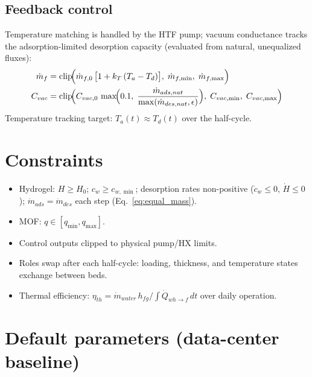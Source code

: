 \documentclass[11pt]{article}
\begin{document}
\subsection{Feedback control}

Temperature matching is handled by the HTF pump; vacuum conductance tracks the adsorption-limited desorption capacity (evaluated from natural, unequalized fluxes):
\begin{align}
\dot{m}_f &= \mathrm{clip}\!\Bigl(\dot{m}_{f,0}\,\bigl[1 + k_T\,(T_a - T_d)\bigr],\; \dot{m}_{f,\min},\; \dot{m}_{f,\max}\Bigr)
\label{eq:ctrl_mf}
\\
C_{vac} &= \mathrm{clip}\!\Bigl(
C_{vac,0}\,\max\!\Bigl(0.1,\; \frac{\dot{m}_{ads,nat}}{\max(\dot{m}_{des,nat}, \epsilon)}\Bigr),\;
C_{vac,\min},\; C_{vac,\max}\Bigr)
\label{eq:ctrl_cvac}
\end{align}
Temperature tracking target: $T_a(t) \approx T_d(t)$ over the half-cycle.

\section{Constraints}

\begin{itemize}
\item Hydrogel: $H \ge H_0$; $c_w \ge c_{w,\min}$; desorption rates non-positive ($\dot{c}_w \le 0$, $\dot{H} \le 0$); $\dot{m}_{ads} = \dot{m}_{des}$ each step (Eq.~\eqref{eq:equal_mass}).
\item MOF: $q \in [q_{\min}, q_{\max}]$.
\item Control outputs clipped to physical pump/HX limits.
\item Roles swap after each half-cycle: loading, thickness, and temperature states exchange between beds.
\item Thermal efficiency: $\eta_{th} = \dot{m}_{water}\,h_{fg} / \int \dot{Q}_{wh\to f}\,dt$ over daily operation.
\end{itemize}

\section{Default parameters (data-center baseline)}
\end{document}
